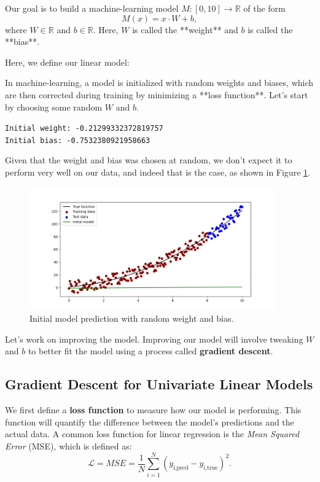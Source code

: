 Our goal is to build a machine-learning model 
$M:[0,10]\to\mathbb{R}$ of the form $$M(x) = x \cdot W + b,$$ where $W\in\mathbb{R}$ and $b\in\mathbb{R}$. Here, $W$ is called the **weight** and $b$ is called the **bias**.   

Here, we define our linear model:



In machine-learning, a model is initialized with random weights and biases, which are then corrected during training by minimizing a **loss function**. Let's start by choosing some random $W$ and $b$.


\texttt{\small{Initial weight: -0.21299332372819757 \\
Initial bias: -0.7532380921958663
}}

Given that the weight and bias was chosen at random, we don't expect it to perform very well on our data, and indeed that is the case, as shown in Figure \ref{fig:linear2}.

\begin{figure}[h]
\centering
\includegraphics[width=300pt]{Regression/code/fig2.png}
\caption{Initial model prediction with random weight and bias.}
\label{fig:linear2}
\end{figure}

Let's work on improving the model. Improving our model will involve tweaking $W$ and $b$ to better fit the model using a process called \textbf{gradient descent}.

\subsection{Gradient Descent for Univariate Linear Models}
\label{subsec:2}
We first define a \textbf{loss function} to measure how our model is performing. This function will quantify the difference between the model's predictions and the actual data. A common loss function for linear regression is the \textit{Mean Squared Error} (MSE), which is defined as:
$$\mathcal{L} = MSE = \frac{1}{N}\sum_{i=1}^N\left(y_\text{i,pred} - y_\text{i,true}\right)^2.$$

